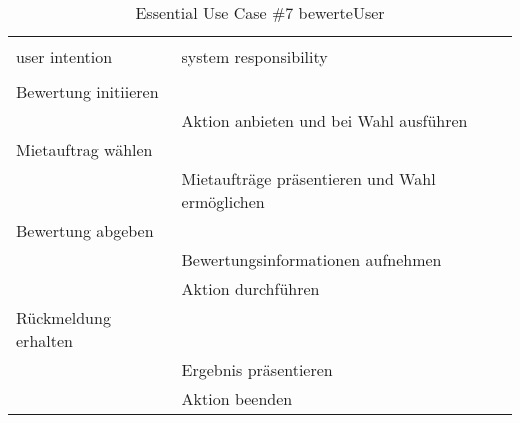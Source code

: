 \begin{table}[H]
\caption{Essential Use Case \#7 bewerteUser }
\centering
\begin{tabular}{l l}
\\ [-0.5ex]

\hline\hline
\\ [-0.5ex]
user intention & system responsibility
\\ [1.5ex]
\hline
\\ [-0.5ex]
Bewertung initiieren    &                                 \\[1ex]
                     & Aktion anbieten und bei Wahl ausführen   \\[1ex]
Mietauftrag wählen         &                                 \\[1ex] 
                     & Mietaufträge präsentieren und Wahl ermöglichen \\[1ex]
Bewertung abgeben          &                                 \\[1ex]
                     & Bewertungsinformationen aufnehmen        \\[1ex]
                     & Aktion durchführen                 \\[1ex]
Rückmeldung erhalten    &                                 \\[1ex]
                     & Ergebnis präsentieren                    \\[1ex]
                     & Aktion beenden                     \\[1ex]

\hline
\end{tabular}
\label{tab:bewertung}
\end{table}

